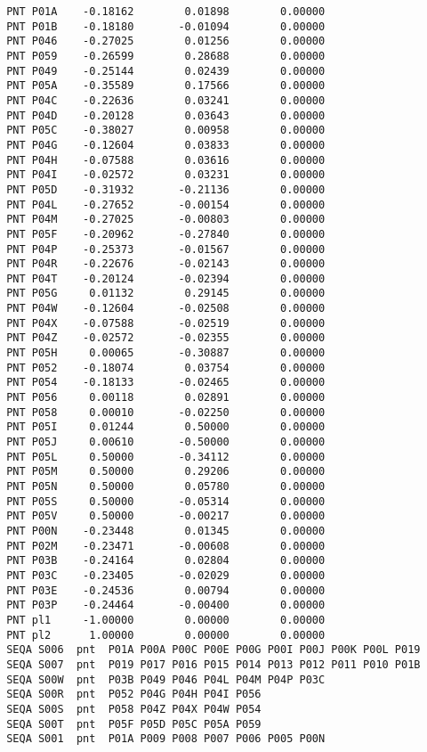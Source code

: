 \documentclass{article}
\begin{document}
\begin{appendix}
\begin{verbatim}
 PNT P01A    -0.18162        0.01898        0.00000 
 PNT P01B    -0.18180       -0.01094        0.00000 
 PNT P046    -0.27025        0.01256        0.00000 
 PNT P059    -0.26599        0.28688        0.00000 
 PNT P049    -0.25144        0.02439        0.00000 
 PNT P05A    -0.35589        0.17566        0.00000 
 PNT P04C    -0.22636        0.03241        0.00000 
 PNT P04D    -0.20128        0.03643        0.00000 
 PNT P05C    -0.38027        0.00958        0.00000 
 PNT P04G    -0.12604        0.03833        0.00000 
 PNT P04H    -0.07588        0.03616        0.00000 
 PNT P04I    -0.02572        0.03231        0.00000 
 PNT P05D    -0.31932       -0.21136        0.00000 
 PNT P04L    -0.27652       -0.00154        0.00000 
 PNT P04M    -0.27025       -0.00803        0.00000 
 PNT P05F    -0.20962       -0.27840        0.00000 
 PNT P04P    -0.25373       -0.01567        0.00000 
 PNT P04R    -0.22676       -0.02143        0.00000 
 PNT P04T    -0.20124       -0.02394        0.00000 
 PNT P05G     0.01132        0.29145        0.00000 
 PNT P04W    -0.12604       -0.02508        0.00000 
 PNT P04X    -0.07588       -0.02519        0.00000 
 PNT P04Z    -0.02572       -0.02355        0.00000 
 PNT P05H     0.00065       -0.30887        0.00000 
 PNT P052    -0.18074        0.03754        0.00000 
 PNT P054    -0.18133       -0.02465        0.00000 
 PNT P056     0.00118        0.02891        0.00000 
 PNT P058     0.00010       -0.02250        0.00000 
 PNT P05I     0.01244        0.50000        0.00000 
 PNT P05J     0.00610       -0.50000        0.00000 
 PNT P05L     0.50000       -0.34112        0.00000 
 PNT P05M     0.50000        0.29206        0.00000 
 PNT P05N     0.50000        0.05780        0.00000 
 PNT P05S     0.50000       -0.05314        0.00000 
 PNT P05V     0.50000       -0.00217        0.00000 
 PNT P00N    -0.23448        0.01345        0.00000 
 PNT P02M    -0.23471       -0.00608        0.00000 
 PNT P03B    -0.24164        0.02804        0.00000 
 PNT P03C    -0.23405       -0.02029        0.00000 
 PNT P03E    -0.24536        0.00794        0.00000 
 PNT P03P    -0.24464       -0.00400        0.00000 
 PNT pl1     -1.00000        0.00000        0.00000 
 PNT pl2      1.00000        0.00000        0.00000 
 SEQA S006  pnt  P01A P00A P00C P00E P00G P00I P00J P00K P00L P019
 SEQA S007  pnt  P019 P017 P016 P015 P014 P013 P012 P011 P010 P01B
 SEQA S00W  pnt  P03B P049 P046 P04L P04M P04P P03C
 SEQA S00R  pnt  P052 P04G P04H P04I P056
 SEQA S00S  pnt  P058 P04Z P04X P04W P054
 SEQA S00T  pnt  P05F P05D P05C P05A P059
 SEQA S001  pnt  P01A P009 P008 P007 P006 P005 P00N

\end{verbatim}
\end{appendix}
\end{document}
